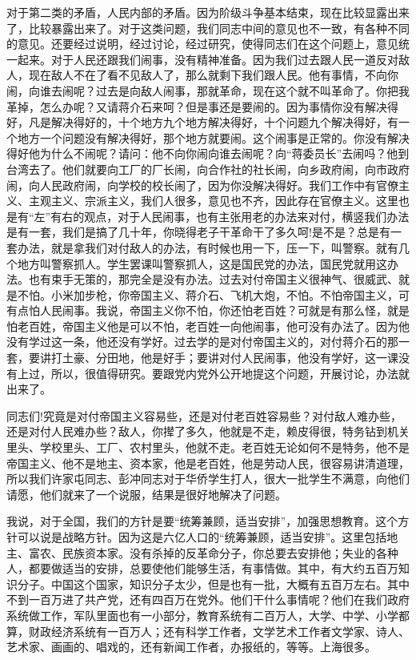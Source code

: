 对于第二类的矛盾，人民内部的矛盾。因为阶级斗争基本结束，现在比较显露出来了，比较暴露出来了。对于这类问题，我们同志中间的意见也不一致，有各种不同的意见。还要经过说明，经过讨论，经过研究，使得同志们在这个问题上，意见统一起来。对于人民还跟我们闹事，没有精神准备。因为我们过去跟人民一道反对敌人，现在敌人不在了看不见敌人了，那么就剩下我们跟人民。他有事情，不向你闹，向谁去闹呢？过去是向敌人闹事，那就革命，现在这个就不叫革命了。你把我革掉，怎么办呢？又请蒋介石来呵？但是事还是要闹的。因为事情你没有解决得好，凡是解决得好的，十个地方九个地方解决得好，十个问题九个解决得好，有一个地方一个问题没有解决得好，那个地方就要闹。这个闹事是正常的。你没有解决得好他为什么不闹呢？请问：他不向你闹向谁去闹呢？向“蒋委员长”去闹吗？他到台湾去了。他们就要向工厂的厂长闹，向合作社的社长闹，向乡政府闹，向市政府闹，向人民政府闹，向学校的校长闹了，因为你没解决得好。我们工作中有官僚主义、主观主义、宗派主义，我们人很多，意见也不齐，因此存在官僚主义。这里也是有“左”有右的观点，对于人民闹事，也有主张用老的办法来对付，横竖我们办法是有一套，我们是搞了几十年，你晓得老子干革命干了多久呵!是不是？总是有一套办法，就是拿我们对付敌人的办法，有时候也用一下，压一下，叫警察。就有几个地方叫警察抓人。学生罢课叫警察抓人，这是国民党的办法，国民党就用这办法。也有束手无策的，那完全是没有办法。过去对付帝国主义很神气、很威武、就是不怕。小米加步枪，你帝国主义、蒋介石、飞机大炮，不怕。不怕帝国主义，可有点怕人民闹事。我说，帝国主义你不怕，你还怕老百姓？可就是有那么怪，就是怕老百姓，帝国主义他是可以不怕，老百姓一向他闹事，他可没有办法了。因为他没有学过这一条，他还没有学好。过去学的是对付帝国主义的，对付蒋介石的那一套，要讲打土豪、分田地，他是好手；要讲对付人民闹事，他没有学好，这一课没有上过，所以，很值得研究。要跟党内党外公开地提这个问题，开展讨论，办法就出来了。

同志们!究竟是对付帝国主义容易些，还是对付老百姓容易些？对付敌人难办些，还是对付人民难办些？敌人，你撵了多久，他就是不走，赖皮得很，特务钻到机关里头、学校里头、工厂、农村里头，他就不走。老百姓无论如何不是特务，他不是帝国主义、他不是地主、资本家，他是老百姓，他是劳动人民，很容易讲清道理，所以我们许家屯同志、彭冲同志对于华侨学生打人，很大一批学生不满意，向他们请愿，他们就来了一个说服，结果是很好地解决了问题。

我说，对于全国，我们的方针是要“统筹兼顾，适当安排”，加强思想教育。这个方针可以说是战略方针。因为这是六亿人口的“统筹兼顾，适当安排”。这里包括地主、富农、民族资本家。没有杀掉的反革命分子，你总要去安排他；失业的各种人，都要做适当的安排，总要使他们能够生活，有事情做。其中，有大约五百万知识分子。中国这个国家，知识分子太少，但是也有一批，大概有五百万左右。其中不到一百万进了共产党，还有四百万在党外。他们干什么事情呢？他们在我们政府系统做工作，军队里面也有一小部分，教育系统有二百万人，大学、中学、小学都算，财政经济系统有一百万人；还有科学工作者，文学艺术工作者文学家、诗人、艺术家、画画的、唱戏的，还有新闻工作者，办报纸的，等等。上海很多。

